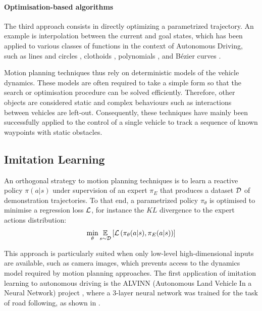 \paragraph{Optimisation-based algorithms}

The third approach consists in directly optimizing a parametrized trajectory. An example is interpolation between the current and goal states, which has been applied to various classes of functions in the context of Autonomous Driving, such as lines and circles \citep{Reeds1990}, clothoids \citep{Funke2012}, polynomials \citep{Xu2012}, and Bézier curves \citep{Gonzalez}.

Motion planning techniques thus rely on deterministic models of the vehicle dynamics. These models are often required to take a simple form so that the search or optimisation procedure can be solved efficiently. Therefore, other objects are considered static and complex behaviours such as interactions between vehicles are left-out.
Consequently, these techniques have mainly been successfully applied to the control of a single vehicle to track a sequence of known waypoints with static obstacles.

\subsection{Imitation Learning}

An orthogonal strategy to motion planning techniques is to learn a reactive policy $\pi(a|s)$ under supervision of an expert $\pi_E$ that produces a dataset $\mathcal{D}$ of demonstration trajectories. To that end, a parametrized policy $\pi_\theta$ is optimised to minimise a regression loss $\mathcal{L}$, for instance the $KL$ divergence to the expert actions distribution:
\begin{equation*}
\min_\theta \operatorname*{\mathbb{E}}_{s\sim \mathcal{D}} \left[\mathcal{L}\left(\pi_{\theta}(a|s), \pi_E(a|s)\right)\right]
\end{equation*}

This approach is particularly suited when only low-level high-dimensional inputs are available, such as camera images, which prevents access to the dynamics model required by motion planning approaches. 
The first application of imitation learning to autonomous driving is the ALVINN (Autonomous Land Vehicle In a Neural Network) project \citep{Pomerleau89}, where a 3-layer neural network was trained for the task of road following, as shown in .

